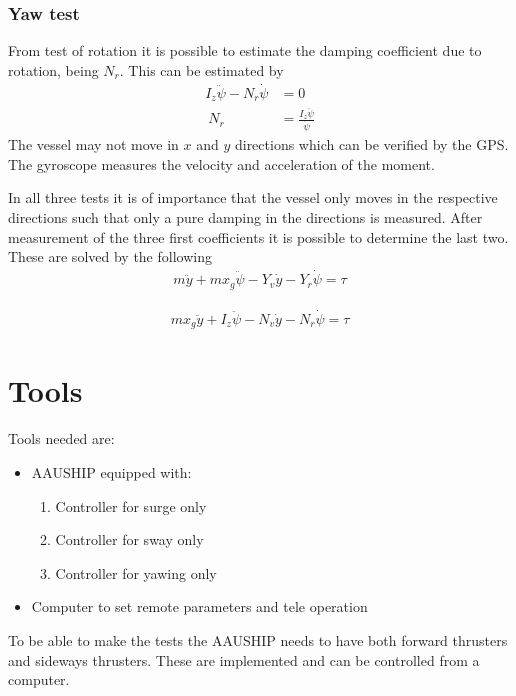 \subsubsection{Yaw test}
From test of rotation it is possible to estimate the damping coefficient due to rotation, being $N_r$. This can be estimated by
\begin{align}
I_z\ddot \psi - N_r \dot \psi &= 0\\\
N_r &= \frac{I_z \ddot \psi}{\dot \psi}
\end{align}
The vessel may not move in $x$ and $y$ directions which can be verified by the \ac{GPS}. The gyroscope measures the velocity and acceleration of the moment.

In all three tests it is of importance that the vessel only moves in the respective directions such that only a pure damping in the directions is measured. After measurement of the three first coefficients it is possible to determine the last two. These are solved by the following
\begin{align}
m \ddot y + mx_g\ddot\psi - Y_v \dot y - Y_r \dot \psi = \tau
\end{align}

\begin{align}
mx_g \ddot y + I_z\ddot \psi - N_v \dot y - N_r \dot \psi = \tau
\end{align}


\section{Tools}
Tools needed are:
\begin{itemize}
	\item AAUSHIP equipped with:
		\begin{enumerate}
			\item Controller for surge only
			\item Controller for sway only
			\item Controller for yawing only
		\end{enumerate}
	\item Computer to set remote parameters and tele operation
\end{itemize}
To be able to make the tests the AAUSHIP needs to have both forward thrusters and sideways thrusters. These are implemented and can be controlled from a computer.

